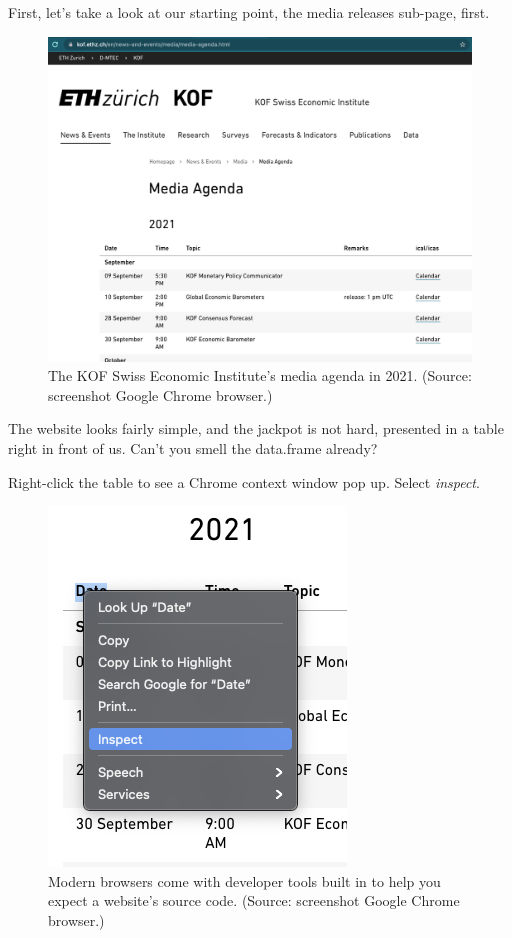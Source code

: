 \documentclass[
  12pt,
  letterpaper,
]{krantz}
\begin{document}
First, let's take a look at our starting point, the media releases
sub-page, first.

\begin{figure}

{\centering \includegraphics{./images/agenda.png}

}

\caption{The KOF Swiss Economic Institute's media agenda in 2021.
(Source: screenshot Google Chrome browser.)}

\end{figure}

The website looks fairly simple, and the jackpot is not hard, presented
in a table right in front of us. Can't you smell the data.frame already?

Right-click the table to see a Chrome context window pop up. Select
\emph{inspect}.

\begin{figure}

{\centering \includegraphics{./images/inspect.png}

}

\caption{Modern browsers come with developer tools built in to help you
expect a website's source code. (Source: screenshot Google Chrome
browser.)}

\end{figure}
\end{document}
